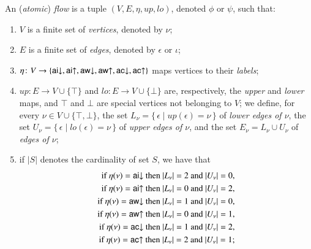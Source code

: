 \newcommand{\ppl  }{{\mathchoice{\scriptstyle+}
                                {\scriptstyle+}
                                {\scriptstyle+}
                                {\scriptscriptstyle+}}}
\newcommand{\pmi  }{{\mathchoice{\scriptstyle-}
                                {\scriptstyle-}
                                {\scriptstyle-}
                                {\scriptscriptstyle-}}}
\newcommand{\card}[1]{\mathord\vert #1\mathord\vert}
\newcommand{\up}{{\mathit up}}
\newcommand{\lo}{{\mathit lo}}
\begin{definition}\label{definition:AtomicFlow}
An (\emph{atomic}) \emph{flow} is a tuple $(V,E,\eta,\up,\lo)$, denoted $\phi$ or $\psi$, such that:
\begin{enumerate}
\item $V$ is a finite set of \emph{vertices}, denoted by $\nu$;
\item $E$ is a finite set of \emph{edges}, denoted by $\epsilon$ or $\iota$;
\item $\eta\colon V\to\{\mathsf{ai}{\downarrow},\mathsf{ai}{\uparrow},\mathsf{aw}{\downarrow},\mathsf{aw}{\uparrow},\mathsf{ac}{\downarrow},\mathsf{ac}{\uparrow}\}$ maps vertices to their \emph{labels};
\item $\up\colon E\to V\cup\{\top\}$ and $\lo\colon E\to V\cup\{\bot\}$ are, respectively, the \emph{upper} and \emph{lower} maps, and $\top$ and $\bot$ are special vertices not belonging to $V$; we define, for every $\nu\in V\cup\{\top,\bot\}$, the set $L_\nu=\{\,\epsilon\mid\up(\epsilon)=\nu\,\}$ of \emph{lower edges of $\nu$}, the set $U_\nu=\{\,\epsilon\mid\lo(\epsilon)=\nu\,\}$ of \emph{upper edges of $\nu$}, and the set $E_\nu=L_\nu\cup U_\nu$ of \emph{edges of $\nu$};
\item if $\card S$ denotes the cardinality of set $S$, we have that
\begin{align*}
\mbox{if $\eta(\nu)=\aid$ then $\card{L_\nu}=2$ and $\card{U_\nu}=0$,}&\\
\mbox{if $\eta(\nu)=\aiu$ then $\card{L_\nu}=0$ and $\card{U_\nu}=2$,}&\\
\mbox{if $\eta(\nu)=\awd$ then $\card{L_\nu}=1$ and $\card{U_\nu}=0$,}&\\
\mbox{if $\eta(\nu)=\awu$ then $\card{L_\nu}=0$ and $\card{U_\nu}=1$,}&\\
\mbox{if $\eta(\nu)=\acd$ then $\card{L_\nu}=1$ and $\card{U_\nu}=2$,}&\\
\mbox{if $\eta(\nu)=\acu$ then $\card{L_\nu}=2$ and $\card{U_\nu}=1$;}&
\end{align*}

\end{enumerate}
\end{definition}
